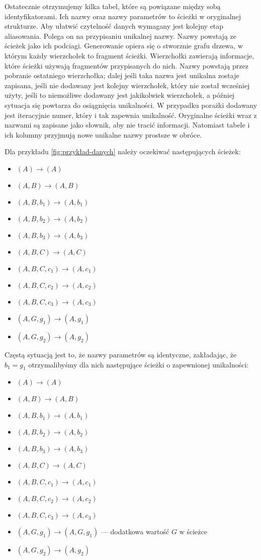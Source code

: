 Ostatecznie otrzymujemy kilka tabel, które są powiązane między sobą identyfikatorami.
Ich nazwy oraz nazwy parametrów to ścieżki w oryginalnej strukturze. Aby ułatwić
czytelność danych wymagany jest kolejny etap aliasowania. Polega on na przypisaniu
unikalnej nazwy. Nazwy powstają ze ścieżek jako ich podciagi. Generowanie opiera się
o stworznie grafu drzewa, w którym każdy wierzchołek to fragment ścieżki. Wierzchołki
zawierają informacje, które ścieżki używają fragmentów przypisanych do nich.
Nazwy powstają przez pobranie ostatniego wierzchołka; dalej jeśli taka nazwa
jest unikalna zostaje zapisana, jeśli nie dodawany jest kolejny wierzchołek, który
nie został wcześniej użyty, jeśli to niemożliwe dodawany jest jakikolwiek wierzchołek,
a później sytuacja się powtarza do osiągnięcia unikalności. W przypadku porażki dodawany
jest iteracyjnie numer, który i tak zapewnia unikalność. Oryginalne ścieżki
wraz z nazwami są zapisane jako słownik, aby nie tracić informacji. Natomiast
tabele i ich kolumny przyjmują nowe unikalne nazwy prostsze w obróce.

Dla przykładu \ref{fig:przykład-danych} należy oczekiwać następujących ścieżek:

\begin{itemize}
\item $(A) \to (A)$
\item $(A, B) \to (A, B)$
\item $(A, B, b_1) \to (A, b_1)$
\item $(A, B, b_2) \to (A, b_2)$
\item $(A, B, b_3) \to (A, b_3)$
\item $(A, B, C) \to (A, C)$
\item $(A, B, C, c_1) \to (A, c_1)$
\item $(A, B, C, c_2) \to (A, c_2)$
\item $(A, B, C, c_3) \to (A, c_3)$
\item $(A, G, g_1) \to (A, g_1)$
\item $(A, G, g_2) \to (A, g_2)$
\end{itemize}

Częstą sytuacją jest to, że nazwy parametrów są identyczne,
zakładając, że $b_1 = g_1$ otrzymalibyśmy dla nich następujące
ścieżki o zapewnionej unikalności:

\begin{itemize}
\item $(A) \to (A)$
\item $(A, B) \to (A, B)$
\item $(A, B, b_1) \to (A, b_1)$
\item $(A, B, b_2) \to (A, b_2)$
\item $(A, B, b_3) \to (A, b_3)$
\item $(A, B, C) \to (A, C)$
\item $(A, B, C, c_1) \to (A, c_1)$
\item $(A, B, C, c_2) \to (A, c_2)$
\item $(A, B, C, c_3) \to (A, c_3)$
\item $(A, G, g_1) \to (A, G, g_1)$ --- 
      dodatkowa wartość $G$ w ścieżce
\item $(A, G, g_2) \to (A, g_2)$
\end{itemize}


